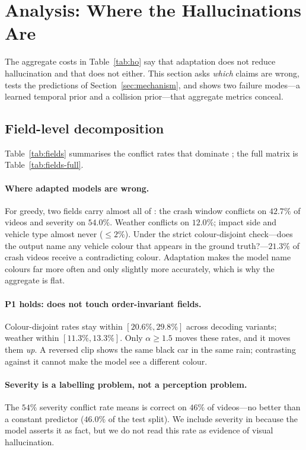 \section{Analysis: Where the Hallucinations Are}
\label{sec:analysis}

The aggregate costs in Table~\ref{tab:ho} say that adaptation does not reduce hallucination and that \tcd{} does not either.
This section asks \emph{which} claims are wrong, tests the predictions of Section~\ref{sec:mechanism}, and shows two failure modes---a learned temporal prior and a collision prior---that aggregate metrics conceal.

\subsection{Field-level decomposition}
\label{sec:fields}

Table~\ref{tab:fields} summarises the conflict rates that dominate \Hcost{}; the full matrix is Table~\ref{tab:fields-full}.



\paragraph{Where adapted models are wrong.}
For \crashlogic{} greedy, two fields carry almost all of \Hcost: the crash window conflicts on $42.7\%$ of videos and severity on $54.0\%$.
Weather conflicts on $12.0\%$; impact side and vehicle type almost never (${\leq}2\%$).
Under the strict colour-disjoint check---does the output name any vehicle colour that appears in the ground truth?---$21.3\%$ of crash videos receive a contradicting colour.
Adaptation makes the model name colours far more often and only slightly more accurately, which is why the aggregate \Hcost{} is flat.

\paragraph{P1 holds: \tcd{} does not touch order-invariant fields.}
Colour-disjoint rates stay within $[20.6\%,29.8\%]$ across decoding variants; weather within $[11.3\%,13.3\%]$.
Only $\alpha{\geq}1.5$ moves these rates, and it moves them \emph{up}.
A reversed clip shows the same black car in the same rain; contrasting against it cannot make the model see a different colour.

\paragraph{Severity is a labelling problem, not a perception problem.}
The $54\%$ severity conflict rate means \crashlogic{} is correct on $46\%$ of videos---no better than a constant  predictor ($46.0\%$ of the test split).
We include severity in \Hcost{} because the model asserts it as fact, but we do not read this rate as evidence of visual hallucination.


